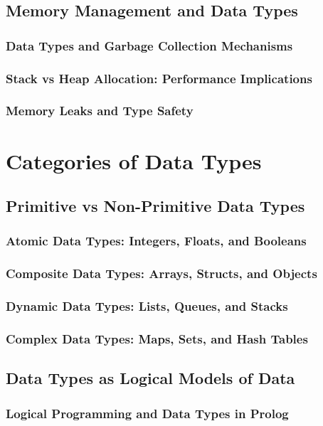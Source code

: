 \documentclass[12pt, oneside]{book}
\begin{document}
\subsection{Memory Management and Data Types}
\subsubsection{Data Types and Garbage Collection Mechanisms}
\subsubsection{Stack vs Heap Allocation: Performance Implications}
\subsubsection{Memory Leaks and Type Safety}

\section{Categories of Data Types}
\subsection{Primitive vs Non-Primitive Data Types}
\subsubsection{Atomic Data Types: Integers, Floats, and Booleans}
\subsubsection{Composite Data Types: Arrays, Structs, and Objects}
\subsubsection{Dynamic Data Types: Lists, Queues, and Stacks}
\subsubsection{Complex Data Types: Maps, Sets, and Hash Tables}
\subsection{Data Types as Logical Models of Data}
\subsubsection{Logical Programming and Data Types in Prolog}
\end{document}
